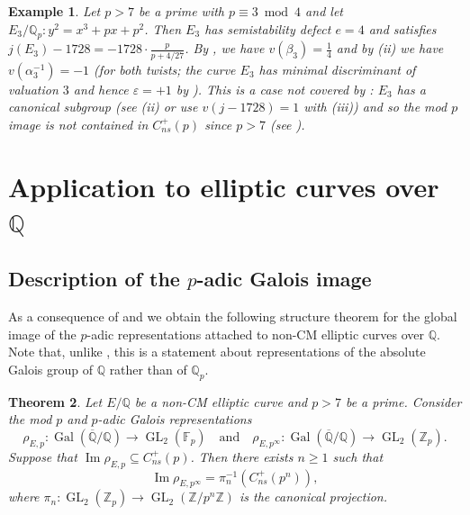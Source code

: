 \documentclass{amsart}
\newcommand{\op}[1]{\operatorname{#1}}
\newcommand{\Qp}{\mathbb{Q}_p}
\newtheorem{theorem}{Theorem}
\newtheorem{example}[theorem]{Example}
\theoremstyle{definition}
\newcommand{\Z}{\mathbb{Z}}
\newcommand{\Q}{\mathbb{Q}}
\newcommand{\F}{\mathbb{F}}
\newcommand{\GL}{\operatorname{GL}}
\numberwithin{theorem}{section}
\numberwithin{equation}{section}
\begin{document}
\begin{example}\label{ex: ambiguous alpha 2}
Let $p>7$ be a prime with $p \equiv 3 \bmod{4}$ and let $E_3/\Q_p: y^2=x^3+px+p^2$. Then $E_3$ has semistability defect $e=4$ and satisfies $j(E_3)-1728 = -1728 \cdot \frac{p}{p + 4/27}$.
By , we have $v(\beta_3)=\frac{1}{4}$ and by (ii) we have $v(\alpha_3^{-1})=-1$ (for both twists; the curve $E_3$ has minimal discriminant of valuation $3$ and hence $\varepsilon=+1$ by ). This is a case not covered by : $E_3$ has a canonical subgroup (see (ii) or use $v(j-1728)=1$ with (iii)) and so the mod $p$ image is not contained in $C_{ns}^+(p)$ since $p>7$ (see ).
\end{example}



\section{Application to elliptic curves over $\Q$}\label{sect: adelic index}

\subsection{Description of the $p$-adic Galois image}\label{subsec: global description p adic image}

As a consequence of  and \cite[Theorem 1.6]{furio24} we obtain the following structure theorem for the global image of the $p$-adic representations attached to non-CM elliptic curves over $\Q$. Note that, unlike , this is a statement about representations of the absolute Galois group of $\mathbb{Q}$ rather than of $\Qp$.

\begin{theorem}\label{thm: no sharp groups over Q}
    Let $E/\Q$ be a non-CM elliptic curve and $p > 7$ be a prime. Consider the mod $p$ and $p$-adic Galois representations
\[
\rho_{E, p} : \op{Gal}(\overline{\Q}/\Q) \to \GL_2(\F_p) \quad \text{and} \quad \rho_{E, p^\infty} : \op{Gal}(\overline{\Q}/\Q) \to \GL_2(\Z_p).
\] 
    Suppose that $\op{Im} \rho_{E, p} \subseteq C_{ns}^+(p)$. Then there exists $n \geq 1$ such that 
    \[
    \op{Im} \rho_{E, p^\infty} = \pi_n^{-1} \left(C_{ns}^+(p^n)\right),
    \]
where $\pi_n : \GL_2(\Z_p) \to \GL_2(\Z/p^n\Z)$ is the canonical projection.
\end{theorem}
\end{document}
